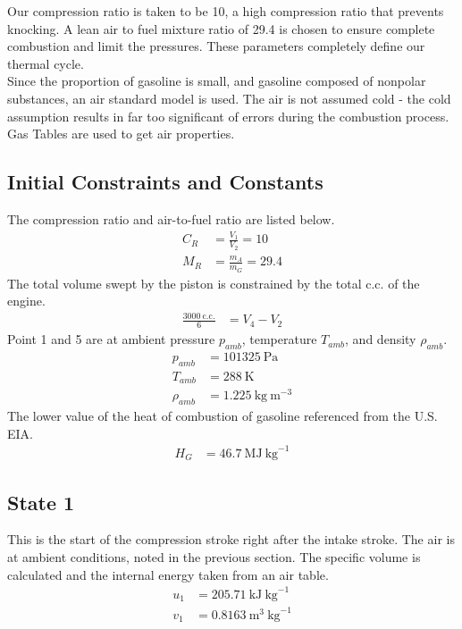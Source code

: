 \documentclass[10pt,a4paper]{article}
\begin{document}
	Our compression ratio is taken to be 10, a high compression ratio that prevents knocking.
	A lean air to fuel mixture ratio of 29.4 is chosen to ensure complete combustion and limit the pressures. These parameters completely define our thermal cycle.\\ Since the proportion of gasoline is small, and gasoline composed of nonpolar substances, an air standard model is used. The air is not assumed cold - the cold assumption results in far too significant of errors during the combustion process. Gas Tables are used to get air properties.
	\subsection*{Initial Constraints and Constants}
	The compression ratio and air-to-fuel ratio are listed below.
	\begin{align*}
		C_R &= \frac{V_1}{V_2} = 10 \\
		M_R &= \frac{m_A}{m_G} = 29.4
	\end{align*}
	The total volume swept by the piston is constrained by the total c.c. of the engine.
	\begin{align*}
		\frac{3000\ \text{c.c.}}{6} &= V_4-V_2 
	\end{align*}
	Point 1 and 5 are at ambient pressure $p_{amb}$, temperature $T_{amb}$, and density $\rho_{amb}$.
	\begin{align*}
		p_{amb} &= 101325\ \text{Pa} \\
		T_{amb} &= 288\ \text{K} \\
		\rho_{amb} &= 1.225\ \text{kg}\ \text{m}^{-3}
	\end{align*}
	The lower value of the heat of combustion of gasoline referenced from the U.S. EIA.
	\begin{align*}
		H_G &= 46.7\ \text{MJ}\ \text{kg}^{-1}
	\end{align*}
	\subsection*{State 1}
	This is the start of the compression stroke right after the intake stroke. The air is at ambient conditions, noted in the previous section. The specific volume is calculated and the internal energy taken from an air table.
	\begin{align*}
		u_1 &= 205.71\ \text{kJ}\ \text{kg}^{-1}\\
		v_1 &= 0.8163\ \text{m}^3\ \text{kg}^{-1}
	\end{align*}
	
\end{document}
